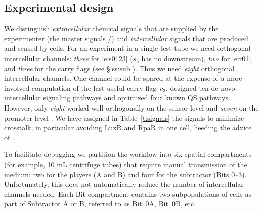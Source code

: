 \documentclass[12pt,notitlepage]{article}
\let\cite\citep
\begin{document}












\subsection{Experimental design} \label{ss:experiment}

We distinguish
\emph{extracellular} chemical signals 
that are supplied by the experimenter
(the master signals /)
and
\emph{intercellular} signals
that are produced and sensed by cells.
%
%
%
For an experiment in a single test tube 
we need
orthogonal intercellular channels:
\emph{three} for \eqref{e:s0123}
($s_3$ has no downstream),
\emph{two} for \eqref{e:r01},
and
\emph{three} for the carry flags
(see \S\ref{ss:sub}).
%
Thus we need \emph{eight} orthogonal intercellular channels.
%
One channel could be spared 
at the expense
of a more involved computation of 
the last useful carry flag~$c_3$.
%
\citet{DuETAL2020}
designed
ten de novo intercellular signaling pathways
and
optimized
four known QS pathways.
%
However,
only \emph{eight} worked well orthogonally
on the sensor level 
and 
\emph{seven} on the promoter level
\cite[\href{https://www.nature.com/articles/s41467-020-17993-w/figures/3}{Fig.~3c/g}]{DuETAL2020}.
%
We have assigned in Table~\ref{t:signals}
the signals
to minimize crosstalk,
in particular 
avoiding LuxR and RpaR in one cell,
heeding the advice of \citet[p.6]{DuETAL2020}.
%
%




%


To facilitate debugging
we partition the workflow
into six 
spatial compartments
(for example, {10 mL centrifuge tubes})
that require manual transmission of 
the medium:
two for the players (A and B)
and
four for the subtractor (Bits 0--3).
%
%
Unfortunately, this does not automatically reduce
the number of intercellular channels needed.
%
Each Bit compartment
contains two subpopulations of cells 
as part of Subtractor A or B,
referred to as Bit~0A, Bit~0B, etc.

%
\end{document}
